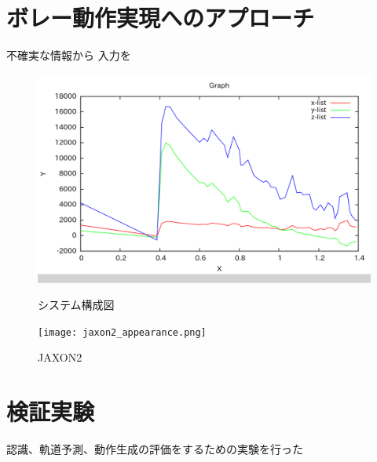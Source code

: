 \documentclass[twocolumn]{preport}
\begin{document}
\section{ボレー動作実現へのアプローチ}
不確実な情報から
入力を

\begin{figure}[tbh]
 \begin{center}
  \begin{minipage}{0.65\columnwidth}
   \includegraphics[width=\columnwidth]{coordinates_graph_316.png}
   \caption{システム構成図}
   \label{figure:system}
  \end{minipage}
  \hspace{0.02\columnwidth}
  \begin{minipage}{0.3\columnwidth}
   \texttt{[image: jaxon2\_appearance.png]}
   \caption{JAXON2}
   \label{figure:est_graph}
  \end{minipage}
 \end{center}
\end{figure}




\section{検証実験}
認識、軌道予測、動作生成の評価をするための実験を行った
\end{document}
